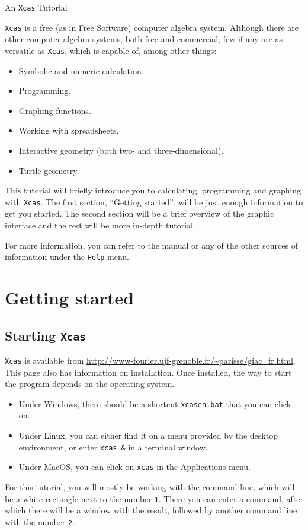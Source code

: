 \documentclass{article}
\begin{document}
\vspace*{1cm}
\begin{center}
{\Huge An \texttt{Xcas} Tutorial}
\end{center}

\tableofcontents

\newpage

\texttt{Xcas} is a free (as in Free Software) computer algebra system.
Although there are other computer algebra systems, both free and
commercial, few if any are as versatile as \texttt{Xcas},
which is capable of, among other things:
\begin{itemize}
  \item
  Symbolic and numeric calculation.
  \item
  Programming.
  \item
  Graphing functions.
  \item
  Working with spreadsheets.
  \item
  Interactive geometry (both two- and three-dimensional).
  \item
  Turtle geometry.
\end{itemize}
This tutorial will briefly introduce you to calculating,
programming and graphing with \texttt{Xcas}.  The first section, 
``Getting started'', will be just enough information to get you
started.  The second section will be a brief overview of the
graphic interface and the rest will be more in-depth tutorial.

For more information, you can refer to the manual or any of the other
sources of information under the \texttt{Help} menu.

\section{Getting started}

\subsection{Starting \texttt{Xcas}}

\texttt{Xcas} is available from 
\url{http://www-fourier.ujf-grenoble.fr/~parisse/giac_fr.html}.
This page also has information on installation.  Once installed, the
way to start the program depends on the operating system.
\begin{itemize}
  \item
  Under Windows, there should be a shortcut \texttt{xcasen.bat} that
  you can click on.
  \item
  Under Linux, you can either find it on a menu provided by the
  desktop environment, or enter \texttt{xcas \&} in a terminal window.
  \item
  Under MacOS, you can click on \texttt{xcas} in the Applications menu.
\end{itemize}
For this tutorial, you will mostly be working with the
command line, which will be a white rectangle next to the number
\texttt{1}.  There you can enter a command, after which there will be
a window with the result, followed by another command line with the
number \texttt{2}.
\end{document}
